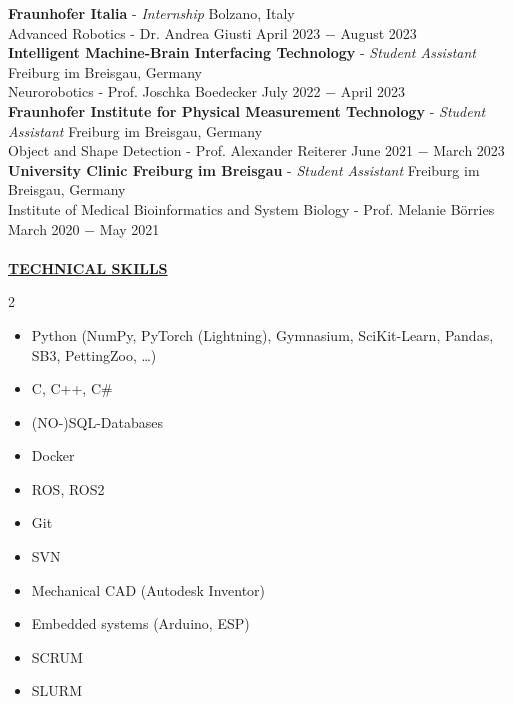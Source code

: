 \documentclass{article}
\begin{document}
\noindent \textbf{Fraunhofer Italia} - \textit{Internship} \hfill Bolzano, Italy \\
\noindent Advanced Robotics  - Dr. Andrea Giusti \hfill April 2023 $-$ August 2023 \\

\noindent \textbf{Intelligent Machine-Brain Interfacing Technology} - \textit{Student Assistant} \hfill Freiburg im Breisgau, Germany \\
\noindent Neurorobotics  - Prof. Joschka Boedecker \hfill July 2022 $-$ April 2023\\


\noindent \textbf{Fraunhofer Institute for Physical Measurement Technology} - \textit{Student Assistant}  \hfill Freiburg im Breisgau, Germany \\
\noindent Object and Shape Detection  - Prof. Alexander Reiterer \hfill June 2021 $-$ March 2023\\

\noindent \textbf{University Clinic Freiburg im Breisgau}  - \textit{Student Assistant} \hfill Freiburg im Breisgau, Germany \\
\noindent Institute of Medical Bioinformatics and System Biology - Prof. Melanie Börries \hfill March 2020 $-$ May 2021 \\ \\

\noindent \textbf{\underline{TECHNICAL SKILLS}}
\begin{multicols}{2}
\begin{itemize}
    \item Python (NumPy, PyTorch (Lightning), Gymnasium, SciKit-Learn, Pandas, SB3, PettingZoo, \ldots)
    \item C, C++, C\#
    \item (NO-)SQL-Databases
    \item Docker
    \item ROS, ROS2
    \item Git
    \item SVN
    \item Mechanical CAD (Autodesk Inventor)
    \item Embedded systems (Arduino, ESP)
    \item SCRUM
    \item SLURM
\end{itemize}
\end{multicols}
\vspace{0.4cm}
\end{document}
